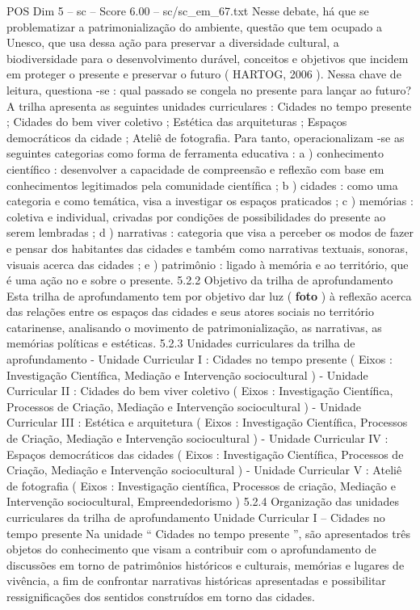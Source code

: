 \begin{textsample}{POS Dim 5 – sc – Score 6.00 – sc/sc\_em\_67.txt}
Nesse debate, há que se problematizar a patrimonialização do ambiente, questão que tem ocupado a Unesco, que usa dessa ação para preservar a diversidade cultural, a biodiversidade para o desenvolvimento durável, conceitos e objetivos que incidem em proteger o presente e preservar o futuro ( HARTOG, 2006 ).
Nessa chave de leitura, questiona -se : qual passado se congela no presente para lançar ao futuro?
A trilha apresenta as seguintes unidades curriculares : Cidades no tempo presente ; Cidades do bem viver coletivo ; Estética das arquiteturas ; Espaços democráticos da cidade ; Ateliê de fotografia.
Para tanto, operacionalizam -se as seguintes categorias como forma de ferramenta educativa : a ) conhecimento científico : desenvolver a capacidade de compreensão e reflexão com base em conhecimentos legitimados pela comunidade científica ; b ) cidades : como uma categoria e como temática, visa a investigar os espaços praticados ; c ) memórias : coletiva e individual, crivadas por condições de possibilidades do presente ao serem lembradas ; d ) narrativas : categoria que visa a perceber os modos de fazer e pensar dos habitantes das cidades e também como narrativas textuais, sonoras, visuais acerca das cidades ; e ) patrimônio : ligado à memória e ao território, que é uma ação no e sobre o presente. 5.2.2 Objetivo da trilha de aprofundamento Esta trilha de aprofundamento tem por objetivo dar luz ( \textbf{foto} ) à reflexão acerca das relações entre os espaços das cidades e seus atores sociais no território catarinense, analisando o movimento de patrimonialização, as narrativas, as memórias políticas e estéticas. 5.2.3 Unidades curriculares da trilha de aprofundamento - Unidade Curricular I : Cidades no tempo presente ( Eixos : Investigação Científica, Mediação e Intervenção sociocultural ) - Unidade Curricular II : Cidades do bem viver coletivo ( Eixos : Investigação Científica, Processos de Criação, Mediação e Intervenção sociocultural ) - Unidade Curricular III : Estética e arquitetura ( Eixos : Investigação Científica, Processos de Criação, Mediação e Intervenção sociocultural ) - Unidade Curricular IV : Espaços democráticos das cidades ( Eixos : Investigação Científica, Processos de Criação, Mediação e Intervenção sociocultural ) - Unidade Curricular V : Ateliê de fotografia ( Eixos : Investigação científica, Processos de criação, Mediação e Intervenção sociocultural, Empreendedorismo ) 5.2.4 Organização das unidades curriculares da trilha de aprofundamento Unidade Curricular I – Cidades no tempo presente Na unidade “ Cidades no tempo presente ”, são apresentados três objetos do conhecimento que visam a contribuir com o aprofundamento de discussões em torno de patrimônios históricos e culturais, memórias e lugares de vivência, a fim de confrontar narrativas históricas apresentadas e possibilitar ressignificações dos sentidos construídos em torno das cidades.

\end{textsample}
